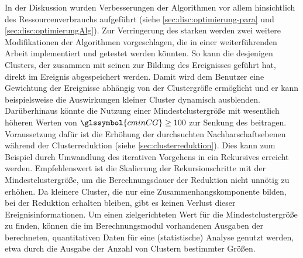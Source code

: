 In der Diskussion wurden Verbesserungen der Algorithmen vor allem hinsichtlich des Ressourcenverbrauchs aufgeführt (siehe \autoref{sec:disc:optimierung-para} und \autoref{sec:disc:optimierungAlg}). Zur Verringerung des starken  werden zwei weitere Modifikationen der Algorithmen vorgeschlagen, die in einer weiterführenden Arbeit implementiert und getestet werden könnten. So kann die  desjenigen Clusters, der zusammen mit seinen  zur Bildung des Ereignisses geführt hat, direkt im Ereignis abgespeichert werden. Damit wird dem Benutzer eine Gewichtung der Ereignisse abhängig von der Clustergröße ermöglicht und er kann beispielsweise die Auswirkungen kleiner Cluster dynamisch ausblenden.
Darüberhinaus könnte die Nutzung einer Mindestclustergröße mit wesentlich höheren Werten von $\glssymbol{cminCG}\ge 100$ zur Senkung des  beitragen. Voraussetzung dafür ist die Erhöhung der durchsuchten Nachbarschaftsebenen während der Clusterreduktion (siehe \autoref{sec:clusterreduktion}). Dies kann zum Beispiel durch Umwandlung des iterativen Vorgehens in ein Rekursives erreicht werden. Empfehlenswert ist die Skalierung der Rekursionschritte mit der Mindestclustergröße, um die Berechnungsdauer der Reduktion nicht unnötig zu erhöhen. Da kleinere Cluster, die nur eine Zusammenhangskomponente bilden, bei der Reduktion erhalten bleiben, gibt es keinen Verlust dieser Ereignisinformationen.
Um einen zielgerichteten Wert für die Mindestclustergröße zu finden, können die im Berechnungsmodul vorhandenen Ausgaben der berechneten, quantitativen Daten für eine (statistische) Analyse genutzt werden, etwa durch die Ausgabe der Anzahl von Clustern bestimmter Größen.


